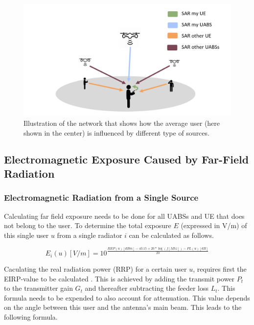 \documentclass[twocolumn]{phdsymp} %
\begin{document}
\begin{figure}[h!]
\centering
  \includegraphics[width=\linewidth]{networkIllustrationSARSources.png}
  \caption{Illustration of the network that shows how the average user (here shown in the center) is influenced by different type of sources. }
  \label{fig:networkIllustration}
\end{figure}

\subsection{Electromagnetic Exposure Caused by Far-Field Radiation} %
\label{sub:Calculatingdownlinkexpsure}

\subsubsection{Electromagnetic Radiation from a Single Source}
\label{sec:calculatingexposure}

Calculating far field exposure needs to be done for all UABSs and UE that does not belong to the user.
To determine the total exposure $E$ (expressed in V/m) of this single user $u$ from a single radiator $i$ can be calculated
as follows.

\begin{equation}
E_i(u) [V/m] = 10^{\frac{RRP(u)[dBm] - 43.15 + 20*\log(f [Mhz])- PL(u) [dB]}{20}}
\label{eq:singleexposure}
\end{equation}

Caculating the real radiation power (RRP) for a certain user $u$, requires first the EIRP-value to be calculated  \cite{J6_originalExposureFormula, J1}.
This is achieved by adding the transmit power $P_t$ to the transmitter gain $G_t$ and thereafter subtracting the feeder loss $L_t$.
This formula needs to be expended to also account for attenuation. This value depends on the angle 
between this user and the antenna's main beam. This leads to the following formula.
\end{document}

